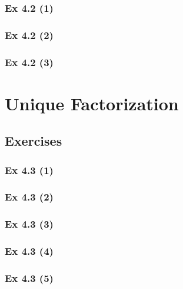 \subsubsection{Ex 4.2 (1)}\label{sec:Ex_4.2.1}

\subsubsection{Ex 4.2 (2)}\label{sec:Ex_4.2.2}

\subsubsection{Ex 4.2 (3)}\label{sec:Ex_4.2.3}

\newpage		%

\section{Unique Factorization}\label{sec:4.3}
\subsection{Exercises}\label{sec:4.3_Exercises}

\subsubsection{Ex 4.3 (1)}\label{sec:Ex_4.3.1}

\subsubsection{Ex 4.3 (2)}\label{sec:Ex_4.3.2}

\subsubsection{Ex 4.3 (3)}\label{sec:Ex_4.3.3}

\subsubsection{Ex 4.3 (4)}\label{sec:Ex_4.3.4}

\subsubsection{Ex 4.3 (5)}\label{sec:Ex_4.3.5}

